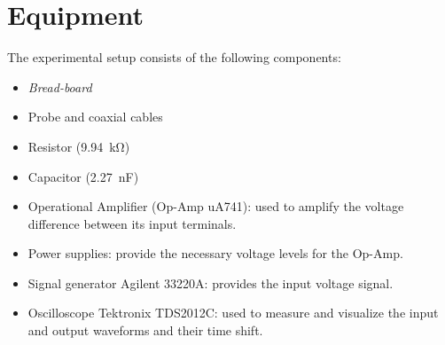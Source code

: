 \section{Equipment}
The experimental setup consists of the following components:

\begin{itemize}
    
    \item \emph{Bread-board}
	\item Probe and coaxial cables
	\item Resistor (\SI{9.94}{\kilo\ohm})
	\item Capacitor (\SI{2.27}{\nano\farad})
    \item Operational Amplifier (Op-Amp uA741): used to amplify the voltage difference between its input terminals.    
    \item Power supplies: provide the necessary voltage levels for the Op-Amp.
    \item Signal generator Agilent 33220A: provides the input voltage signal.
    \item Oscilloscope Tektronix TDS2012C: used to measure and visualize the input and output waveforms and their time shift.

\end{itemize}
